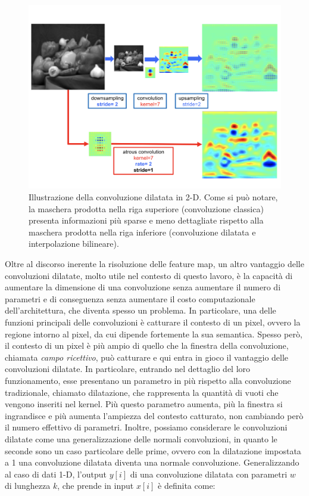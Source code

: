 \begin{figure}[h!]
  \hspace*{0.2in}
  \includegraphics[scale=0.55]{img/dil_conv.png}
  \caption{Illustrazione della convoluzione dilatata in 2-D. Come si può notare, la maschera prodotta nella riga superiore (convoluzione classica) presenta informazioni più sparse e meno dettagliate rispetto alla maschera prodotta nella riga inferiore (convoluzione dilatata e interpolazione bilineare).}
  \label{fig:atrous_conv}
\end{figure}

Oltre al discorso inerente la risoluzione delle feature map, un altro vantaggio delle convoluzioni dilatate, molto utile nel contesto di questo lavoro, è la capacità di aumentare la dimensione di una convoluzione senza aumentare il numero di parametri e di conseguenza senza aumentare il costo computazionale dell'architettura, che diventa spesso un problema. In particolare, una delle funzioni principali delle convoluzioni è catturare il contesto di un pixel, ovvero la regione intorno al pixel, da cui dipende fortemente la sua semantica. Spesso però, il contesto di un pixel è più ampio di quello che la finestra della convoluzione, chiamata \textit{campo ricettivo}, può catturare e qui entra in gioco il vantaggio delle convoluzioni dilatate. In particolare, entrando nel dettaglio del loro funzionamento, esse presentano un parametro in più rispetto alla convoluzione tradizionale, chiamato dilatazione, che rappresenta la quantità di vuoti che vengono inseriti nel kernel. Più questo parametro aumenta, più la finestra si ingrandisce e più aumenta l'ampiezza del contesto catturato, non cambiando però il numero effettivo di parametri.
Inoltre, possiamo considerare le convoluzioni dilatate come una generalizzazione delle normali convoluzioni, in quanto le seconde sono un caso particolare delle prime, ovvero con la dilatazione impostata a 1 una convoluzione dilatata diventa una normale convoluzione. Generalizzando al caso di dati 1-D, l'output $y[i]$ di una convoluzione dilatata con parametri $w$ di lunghezza $k$, che prende in input $x[i]$ è definita come:

